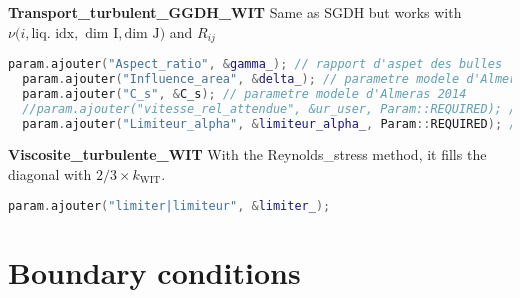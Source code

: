 \textbf{Transport_turbulent_GGDH_WIT} Same as SGDH but works with $\nu(i, \text{liq. idx},$ $\text{dim I}, \text{dim J})$ and $R_{ij}$
\begin{lstlisting}[language=c++]
  param.ajouter("Aspect_ratio", &gamma_); // rapport d'aspet des bulles
  param.ajouter("Influence_area", &delta_); // parametre modele d'Almeras 2014 (taille du sillage)
  param.ajouter("C_s", &C_s); // parametre modele d'Almeras 2014
  //param.ajouter("vitesse_rel_attendue", &ur_user, Param::REQUIRED); // valeur de ur a prendre si u_r(i,0)=0
  param.ajouter("Limiteur_alpha", &limiteur_alpha_, Param::REQUIRED); // valeur minimal de (1-alpha) pour utiliser le modele d'Almeras
\end{lstlisting}


\textbf{Viscosite_turbulente_WIT}
With the Reynolds_stress method, it fills the diagonal with $2/3 \times k_{\text{WIT}}$.
\begin{lstlisting}[language=c++]
param.ajouter("limiter|limiteur", &limiter_);
\end{lstlisting}


\section{Boundary conditions}

